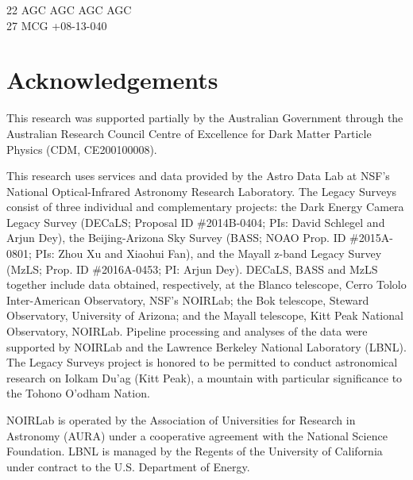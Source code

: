 \documentclass{article}
\begin{document}
\begin{tabbing}
  22 AGC     AGC    AGC        AGC    \\%
   27 MCG\>                 +08-13-040\\%
\end{tabbing}
\section*{Acknowledgements}
This research was supported partially by the Australian Government through the Australian Research Council Centre of Excellence for Dark Matter Particle Physics (CDM, CE200100008).

This research uses services and data provided by the Astro Data Lab at NSF's
National Optical-Infrared Astronomy Research Laboratory. %
The Legacy Surveys consist of three individual and complementary projects: the Dark Energy Camera Legacy Survey (DECaLS; Proposal ID \#2014B-0404; PIs: David Schlegel and Arjun Dey), the Beijing-Arizona Sky Survey (BASS; NOAO Prop. ID \#2015A-0801; PIs: Zhou Xu and Xiaohui Fan), and the Mayall z-band Legacy Survey (MzLS; Prop. ID \#2016A-0453; PI: Arjun Dey). DECaLS, BASS and MzLS together include data obtained, respectively, at the Blanco telescope, Cerro Tololo Inter-American Observatory, NSF's NOIRLab; the Bok telescope, Steward Observatory, University of Arizona; and the Mayall telescope, Kitt Peak National Observatory, NOIRLab. Pipeline processing and analyses of the data were supported by NOIRLab and the Lawrence Berkeley National Laboratory (LBNL). The Legacy Surveys project is honored to be permitted to conduct astronomical research on Iolkam Du'ag (Kitt Peak), a mountain with particular significance to the Tohono O'odham Nation.

NOIRLab is operated by the Association of Universities for Research in Astronomy (AURA) under a cooperative agreement with the National Science Foundation. LBNL is managed by the Regents of the University of California under contract to the U.S. Department of Energy.
\end{document}

